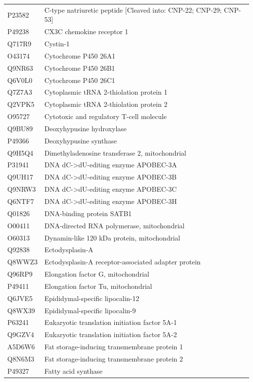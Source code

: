 \documentclass[10pt,twoside]{article}
\begin{document}
\begin{longtable}{lL{0.75\textwidth}}
P23582	&	C-type natriuretic peptide [Cleaved into: CNP-22; CNP-29; CNP-53]	\\
P49238	&	CX3C chemokine receptor 1 	\\
Q717R9	&	Cystin-1 	\\
O43174	&	Cytochrome P450 26A1 	\\
Q9NR63	&	Cytochrome P450 26B1 	\\
Q6V0L0	&	Cytochrome P450 26C1 	\\
Q7Z7A3	&	Cytoplasmic tRNA 2-thiolation protein 1 	\\
Q2VPK5	&	Cytoplasmic tRNA 2-thiolation protein 2 	\\
O95727	&	Cytotoxic and regulatory T-cell molecule 	\\
Q9BU89	&	Deoxyhypusine hydroxylase 	\\
P49366	&	Deoxyhypusine synthase 	\\
Q9H5Q4	&	Dimethyladenosine transferase 2, mitochondrial 	\\
P31941	&	DNA dC->dU-editing enzyme APOBEC-3A 	\\
Q9UH17	&	DNA dC->dU-editing enzyme APOBEC-3B 	\\
Q9NRW3	&	DNA dC->dU-editing enzyme APOBEC-3C 	\\
Q6NTF7	&	DNA dC->dU-editing enzyme APOBEC-3H 	\\
Q01826	&	DNA-binding protein SATB1 	\\
O00411	&	DNA-directed RNA polymerase, mitochondrial 	\\
O60313	&	Dynamin-like 120 kDa protein, mitochondrial 	\\
Q92838	&	Ectodysplasin-A 	\\
Q8WWZ3	&	Ectodysplasin-A receptor-associated adapter protein 	\\
Q96RP9	&	Elongation factor G, mitochondrial 	\\
P49411	&	Elongation factor Tu, mitochondrial 	\\
Q6JVE5	&	Epididymal-specific lipocalin-12	\\
Q8WX39	&	Epididymal-specific lipocalin-9 	\\
P63241	&	Eukaryotic translation initiation factor 5A-1 	\\
Q9GZV4	&	Eukaryotic translation initiation factor 5A-2 	\\
A5D6W6	&	Fat storage-inducing transmembrane protein 1 	\\
Q8N6M3	&	Fat storage-inducing transmembrane protein 2 	\\
P49327	&	Fatty acid synthase 	\\

\end{longtable}
\end{document}
